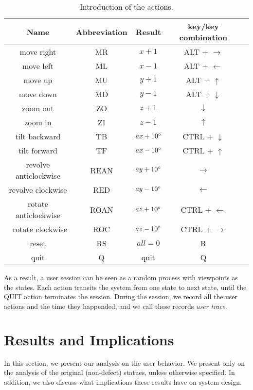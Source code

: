 \begin{table}
    \centering
    \begin{tabular}{|c|c|c|c|c|}
        \hline
        Name & Abbreviation & Result & key/key combination \\
        \hline
        move right & MR     & $x + 1$  & ALT + $\rightarrow$\\
        move left  & ML     & $x - 1$  & ALT + $\leftarrow$\\
        move up    & MU     & $y + 1$  & ALT + $\uparrow$\\
        move down  & MD     & $y - 1$  & ALT + $\downarrow$\\
        zoom out   & ZO     & $z + 1$  & $\downarrow$\\
        zoom in    & ZI     & $z - 1$  & $\uparrow$\\
        tilt backward & TB  & $ax + 10^\circ$ & CTRL + $\downarrow$\\
        tilt forward & TF   & $ax - 10^\circ$ & CTRL + $\uparrow$\\
        revolve anticlockwise & REAN & $ay + 10^\circ$ & $\rightarrow$\\
        revolve clockwise & RED & $ay - 10^\circ$ & $\leftarrow$\\
        rotate  anticlockwise & ROAN & $az + 10^\circ$ & CTRL + $\leftarrow$\\\
        rotate  clockwise & ROC &  $az - 10^\circ$ & CTRL + $\rightarrow$\\
        reset      & RS     & $all = 0$  & R \\
        quit       & Q      & quit     & Q \\
        \hline
    \end{tabular}
    \caption{Introduction of the actions.}\label{t:user:action}
\end{table}


As a result, a user session can be seen as a random process 
with viewpoints as the states. Each action transits
the system from one state to next state, until the QUIT
action terminates the session. During the session, we record
all the user actions and the time they happended, and we call these 
records \textit{user trace}.

\section{Results and Implications}
In this section, we present our analysis on the user behavior. We present only on the analysis of the original (non-defect) statues, unless otherwise specified.
In addition, we also discuss what implications these results have on system design.

